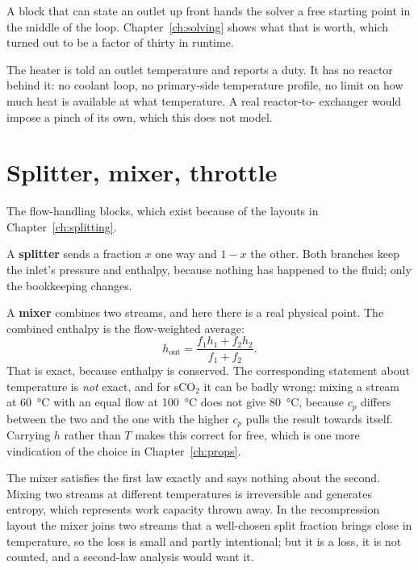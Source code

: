 \documentclass[11pt,a4paper]{report}
\begin{document}
\noindent A block that can state an outlet up front hands the solver a free
starting point in the middle of the loop. Chapter~\ref{ch:solving} shows
what that is worth, which turned out to be a factor of thirty in runtime.

\begin{caveat}[title={Caveat: the heat source is a temperature, not a reactor}]
The heater is told an outlet temperature and reports a duty. It has no
reactor behind it: no coolant loop, no primary-side temperature profile, no
limit on how much heat is available at what temperature. A real
reactor-to- exchanger would impose a pinch of its own, which this
does not model.
\end{caveat}

\section{Splitter, mixer, throttle}

The flow-handling blocks, which exist because of the layouts in
Chapter~\ref{ch:splitting}.

A \textbf{splitter} sends a fraction $x$ one way and $1-x$ the other. Both
branches keep the inlet's pressure and enthalpy, because nothing has
happened to the fluid; only the bookkeeping changes.

A \textbf{mixer} combines two streams, and here there is a real physical
point. The combined enthalpy is the flow-weighted average:
\[
  h_{\text{out}} = \frac{f_1 h_1 + f_2 h_2}{f_1 + f_2}.
\]
That is exact, because enthalpy is conserved. The corresponding statement
about temperature is \emph{not} exact, and for sCO$_2$ it can be badly wrong:
mixing a stream at \SI{60}{\celsius} with an equal flow at
\SI{100}{\celsius} does not give \SI{80}{\celsius}, because $c_p$ differs
between the two and the one with the higher $c_p$ pulls the result towards
itself. Carrying $h$ rather than $T$ makes this correct for free, which is
one more vindication of the choice in Chapter~\ref{ch:props}.

\begin{caveat}[title={Caveat: mixing streams at different temperatures destroys work}]
The mixer satisfies the first law exactly and says nothing about the second.
Mixing two streams at different temperatures is irreversible and generates
entropy, which represents work capacity thrown away. In the recompression
layout the mixer joins two streams that a well-chosen split fraction brings
close in temperature, so the loss is small and partly intentional; but it is
a loss, it is not counted, and a second-law analysis would want it.
\end{caveat}
\end{document}
